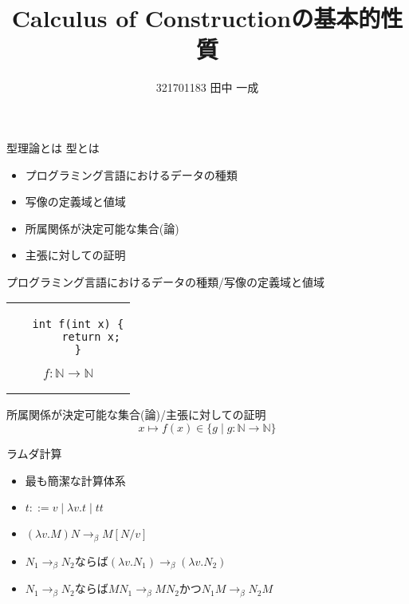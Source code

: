 \documentclass[18pt]{beamer}
\begin{document}
\title{Calculus of Constructionの基本的性質}
\author{321701183 田中 一成}


\frame{\maketitle}

\begin{frame}{型理論とは}
 型とは
 \begin{itemize}
  \item プログラミング言語におけるデータの種類
  \item 写像の定義域と値域
  \item 所属関係が決定可能な集合(論)
  \item 主張に対しての証明
 \end{itemize}
\end{frame}

\begin{frame}[fragile]{プログラミング言語におけるデータの種類/写像の定義域と値域}
\begin{tabular}{c}
 \begin{minipage}{0.5\textwidth}
  \begin{verbatim}
   int f(int x) {
       return x;
   }
  \end{verbatim}
 \end{minipage}
 \begin{minipage}{0.5\textwidth}
 \[
 f \colon \mathbb{N} \rightarrow \mathbb{N}
 \]
 \end{minipage}
\end{tabular}
\end{frame}

\begin{frame}[fragile]{所属関係が決定可能な集合(論)/主張に対しての証明}
 \[
 x \mapsto f (x) \in \{ g \mid g \colon \mathbb{N} \rightarrow \mathbb{N} \}
 \]
\begin{prooftree}
\end{prooftree}
\end{frame}

\begin{frame}{ラムダ計算}
 \begin{itemize}
  \item 最も簡潔な計算体系
  \item $t ::= v \mid \lambda v. t \mid t t$
  \item $(\lambda v. M) N \rightarrow_\beta M[N/v]$
  \item $N_1 \rightarrow_\beta N_2$ならば$(\lambda v. N_1) \rightarrow_\beta (\lambda v. N_2)$ \item $N_1 \rightarrow_\beta N_2$ならば$M N_1 \rightarrow_\beta M N_2$かつ$N_1 M \rightarrow_\beta N_2 M$
 \end{itemize}
\end{frame}
\end{document}
